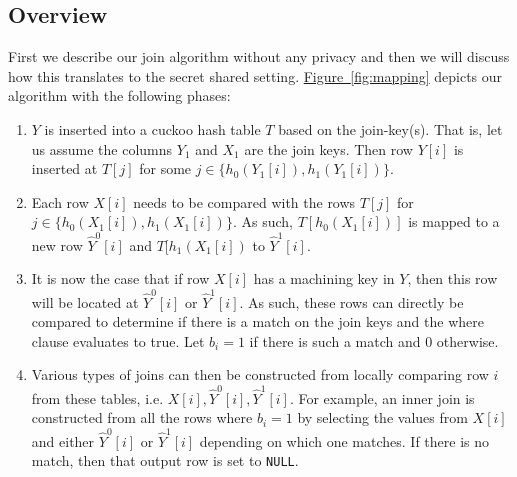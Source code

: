 \documentclass[11pt,letterpaper]{article}
\newcommand{\ytable}{\ensuremath{T}\xspace}
\newcommand{\Null}{\texttt{NULL}\xspace}
\newcommand{\namedref}[2]{\hyperref[#2]{#1~\ref*{#2}}}
\newcommand{\figureref}[1]{\namedref{Figure}{#1}}
\begin{document}
\subsection{Overview}
First we describe our join algorithm without any privacy and then we will discuss how this translates to the secret shared setting. \figureref{fig:mapping} depicts our algorithm with the following phases:
\begin{enumerate}
	\item \label{step:overview1}  $Y$ is inserted into a cuckoo hash table $\ytable$ based on the join-key(s). That is, let us assume the columns $Y_1$ and $X_1$ are the join keys. Then 
	row $Y[i]$ is inserted at $\ytable[j]$ for some $j\in \{h_0(Y_1[i]), h_1(Y_1[i])\}$.
	\item \label{step:overview2} Each row $X[i]$ needs to be compared with the rows $\ytable[j]$ for $j\in \{h_0(X_1[i]), h_1(X_1[i])\}$. As such, $\ytable[h_0(X_1[i])]$ is mapped to a new row $\widehat{Y}^0[i]$ and $\ytable[h_1(X_1[i])$ to $\widehat{Y}^1[i]$. 
	\item \label{step:overview3} It is now the case that if row $X[i]$ has a machining key in $Y$, then this row will be located at $\widehat{Y}^0[i]$ or $\widehat{Y}^1[i]$. As such, these rows can directly be compared to determine if there is a match on the join keys and the where clause evaluates to true. Let $b_i=1$ if there is such a match and $0$ otherwise.
	\item \label{step:overview4} Various types of joins can then be constructed from locally comparing row $i$ from these tables, i.e. $X[i],\widehat{Y}^0[i], \widehat{Y}^1[i]$. For example, an inner join is constructed from all the rows where $b_i=1$ by selecting the values from $X[i]$ and either $\widehat{Y}^0[i]$ or $\widehat{Y}^1[i]$ depending on which one matches. If there is no match, then that output row is set to \Null.
\end{enumerate} 
\end{document}
